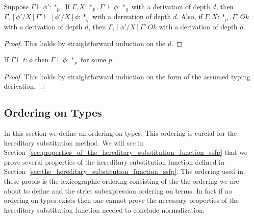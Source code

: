 \begin{lemma}
  Suppose $\Gamma \vdash \phi':*_p$.  If $\Gamma,X:*_p,\Gamma' \vdash \phi:*_q$ 
  with a derivation of depth $d$, then $\Gamma,[\phi'/X]\Gamma' \vdash [\phi'/X]\phi:*_q$
  with a derivation of depth $d$.
  Also, if $\Gamma,X:*_p,\Gamma'\ Ok$ with a derivation of depth $d$, then 
  $\Gamma,[\phi'/X]\Gamma'\ Ok$ with a derivation of depth $d$.
  \label{lemma:substitution_for_kinding_ssfp}
\end{lemma}
\begin{proof}
  This holds by straightforward induction on the $d$.
\end{proof}

\begin{lemma}[Regularity]
  If $\Gamma \vdash t:\phi$ then $\Gamma \vdash \phi:*_p$ for some $p$.
  \label{lemma:regularity_ssfp}
\end{lemma}
\begin{proof}
  This holds by straightforward induction on the form of the assumed
  typing derivation.
\end{proof}

\subsection{Ordering on Types}
\label{subsec:ordering_on_types_ssfp}
In this section we define an ordering on types.  This ordering is
curcial for the hereditary substitution method.  We will see in
Section~\ref{sec:properties_of_the_hereditary_substitution_function_ssfp}
that we prove several properties of the hereditary substitution
function defined in
Section~\ref{sec:the_hereditary_substitution_function_ssfp}.  The
ordering used in these proofs is the lexicographic ordering consisting
of the the ordering we are about to define and the strict
subexpression ordering on terms.  In fact if no ordering on types exists then
one cannot prove the necessary properties of the hereditary
substitution function needed to conclude normalization.

